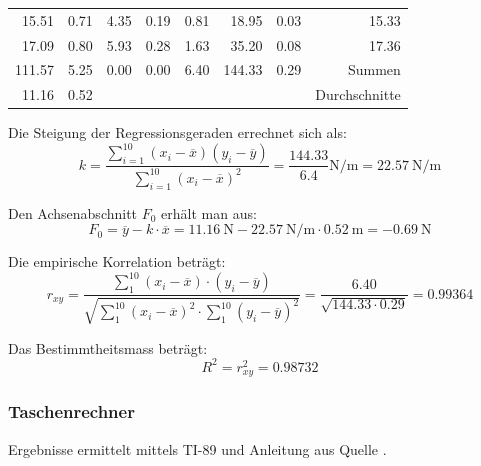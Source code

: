 \begin{tabular}{rrrrrrrr}
              15.51&        0.71&               4.35  &               0.19  &                 0.81                   &        18.95           &         0.03           &  15.33 \\
              17.09&        0.80&               5.93  &               0.28  &                 1.63                   &        35.20           &         0.08           &  17.36 \\
    \midrule
             111.57&        5.25&               0.00  &               0.00  &                 6.40                   &       144.33           &         0.29           & Summen \\
    \midrule
              11.16&        0.52&&&&&& Durchschnitte \\
    \bottomrule
\end{tabular}

Die Steigung der Regressionsgeraden errechnet sich als:
\begin{equation}
    k = \frac{\sum_{i=1}^{10}(x_i-\overline{x})(y_i-\overline{y})}{\sum_{i=1}^{10}(x_i-\overline{x})^2} = \frac{144.33}{6.4} \si{\newton\per\meter} = \SI{22.57}{\newton\per\meter}
\end{equation}

Den Achsenabschnitt $F_0$ erh\"alt man aus:
\begin{equation}
    F_0 = \overline{y} - k \cdot \overline{x} = \SI{11.16}{\newton} - \SI{22.57}{\newton\per\meter} \cdot \SI{0.52}{\meter} = \SI{-0.69}{\newton}
\end{equation}

Die empirische Korrelation betr\"agt:
\begin{equation}
    r_{xy} = \frac{\sum_{1}^{10}(x_i - \overline{x}) \cdot (y_i - \overline{y})}{\sqrt{\sum_{1}^{10}(x_i-\overline{x})^2 \cdot \sum_{1}^{10}(y_i-\overline{y})^2}}
           = \frac{6.40}{\sqrt{144.33 \cdot 0.29}} = 0.99364
\end{equation}

Das Bestimmtheitsmass betr\"agt:
\begin{equation}
    R^{2} = r_{xy}^2 = 0.98732
\end{equation}

\subsubsection{Taschenrechner}

Ergebnisse ermittelt mittels TI-89 und Anleitung aus Quelle \cite{ref:ti89:regression}.

